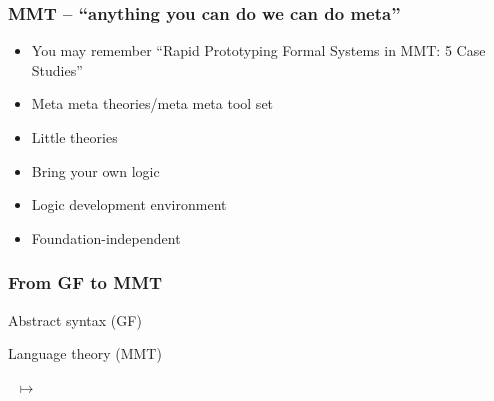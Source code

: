 \documentclass[dvipsnames]{beamer}
\def\GF{\textsf{GF}\xspace}
\def\MMT{\textsf{MMT}\xspace}
\begin{document}
\begin{frame}
    \frametitle{\MMT{} -- ``anything you can do we can do meta''~\cite{RabKoh:WSMSML13}}
    \begin{itemize}
        \item You may remember ``Rapid Prototyping Formal Systems in MMT: 5 Case Studies''~\cite{MueRab:rpfsm}
        \item Meta meta theories/meta meta tool set
        \item Little theories
        \item Bring your own logic
        \item Logic development environment
        \item Foundation-independent
    \end{itemize}
\end{frame}

\begin{frame}[fragile]
    \frametitle{From \GF{} to \MMT{}}

    \begin{minipage}{0.49\textwidth}
        Abstract syntax (\GF)
        
        \vspace{0.6em}
        
    \end{minipage}
    \begin{minipage}{0.47\textwidth}
        Language theory (\MMT)

        \vspace{0.6em}
        
    \end{minipage}

    \vspace{0.4em}
    $\;\;\mapsto\;\;$ 
\end{frame}
\end{document}
